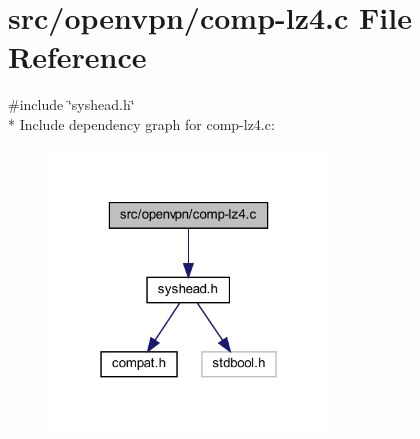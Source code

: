 \hypertarget{comp-lz4_8c}{}\section{src/openvpn/comp-\/lz4.c File Reference}
\label{comp-lz4_8c}
{\ttfamily \#include \char`\"{}syshead.\+h\char`\"{}}\\*
Include dependency graph for comp-\/lz4.c\+:
\nopagebreak
\begin{figure}[H]
\begin{center}
\leavevmode
\includegraphics[width=211pt]{comp-lz4_8c__incl}
\end{center}
\end{figure}
